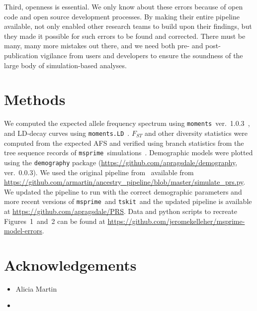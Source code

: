 \documentclass{article}
\newcommand{\msprime}[0]{\texttt{msprime}}
\newcommand{\tskit}[0]{\texttt{tskit}}
\begin{document}
Third, openness is essential. We only know about these errors because of open code and
open source development processes. By making their entire pipeline available,
\citet{martin2017human} not only enabled other research teams to build upon their findings,
but they made it possible for such errors to be found and corrected.
There must be many, many more mistakes out there, and we need both
pre- and post-publication vigilance from users and developers to ensure the
soundness of the large body of simulation-based analyses.

\section{Methods}


We computed the expected allele frequency spectrum using
\texttt{moments}~ver.~1.0.3~\citep{jouganous2017inferring}, and LD-decay curves using
\texttt{moments.LD}~\citep{ragsdale2019models}. $F_{ST}$ and other diversity statistics
were computed from the expected AFS and verified using branch statistics from the
tree sequence records of \msprime\ simulations~\citep{ralph2020efficiently}.
Demographic models were plotted using the \texttt{demography} package
(\url{https://github.com/apragsdale/demography}, ver.~0.0.3).
We used the original pipeline from~\citet{martin2017human} available from
\url{https://github.com/armartin/ancestry_pipeline/blob/master/simulate_prs.py}.
We updated the pipeline to run with the correct demographic parameters and more
recent versions of \msprime\ and \tskit\, and the updated pipeline is
available at \url{https://github.com/apragsdale/PRS}.
Data and python scripts to recreate Figures~1~and~2 can be found at
\url{https://github.com/jeromekelleher/msprime-model-errors}.

\section*{Acknowledgements}

\begin{itemize}
\item Alicia Martin
\item
\end{itemize}




\pagebreak
\end{document}

